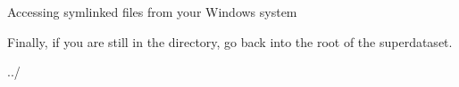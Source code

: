 \begin{windowswit}[label={ww-wsl2-symlinks}, before title={\thetcbcounter\ }, float, floatplacement=tbp, check odd page=true]{Accessing symlinked files from your Windows system}
\end{windowswit}

\sphinxAtStartPar
Finally, if you are still in the  directory, go back into the root of
the superdataset.

\begin{sphinxVerbatim}[commandchars=\\\{\}]
../
\end{sphinxVerbatim}

\sphinxstepscope


